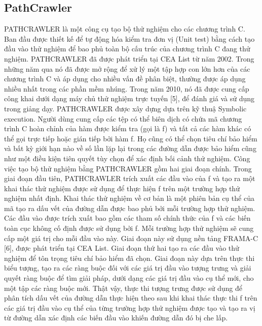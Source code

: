 \documentclass[12pt,a4paper]{article}
\begin{document}
\subsection{PathCrawler}
PATHCRAWLER là một công cụ tạo bộ thử nghiệm cho các chương trình C. Ban đầu được thiết kế để tự động hóa  kiểm tra đơn vị (Unit test) bằng cách tạo đầu vào thử nghiệm để bao phủ toàn bộ cấu trúc của chương trình C đang thử nghiệm.\newline
\indent PATHCRAWLER đã được phát triển tại CEA List từ năm 2002. Trong những năm qua nó đã được mở rộng để xử lý một tập hợp con lớn hơn của các chương trình C và áp dụng cho nhiều vấn đề phân biệt, thường được áp dụng nhiều nhất trong các phần mềm nhúng. Trong năm 2010, nó đã được cung cấp công khai dưới dạng máy chủ thử nghiệm trực tuyến [5], để đánh giá và sử dụng trong giảng dạy.\newline
\indent PATHCRAWLER được xây dựng dựa trên kỹ thuậ Symbolic execution. Người dùng cung cấp các tệp có thể biên dịch có chứa mã chương trình C hoàn chỉnh của hàm được kiểm tra (gọi là f) và tất cả các hàm khác có thể gọi trực tiếp hoặc gián tiếp bởi hàm f. Họ cũng có thể chọn tiêu chí bảo hiểm và bất kỳ giới hạn nào về số lần lặp lại trong các đường dẫn được bảo hiểm cũng như một điều kiện tiên quyết tùy chọn để xác định bối cảnh thử nghiệm. Công việc tạo bộ thử nghiệm bằng PATHCRAWLER gồm hai giai đoạn chính. Trong giai đoạn đầu tiên, PATHCRAWLER trích xuất các đầu vào của f và tạo ra một khai thác thử nghiệm được sử dụng để thực hiện f trên một trường hợp thử nghiệm nhất định. Khai thác thử nghiệm về cơ bản là một phiên bản cụ thể của mã tạo ra dấu vết của đường dẫn được bao phủ bởi mỗi trường hợp thử nghiệm. Các đầu vào được trích xuất bao gồm các tham số chính thức của f và các biến toàn cục không cố định được sử dụng bởi f. Mỗi trường hợp thử nghiệm sẽ cung cấp một giá trị cho mỗi đầu vào này. Giai đoạn này sử dụng nền tảng FRAMA-C [6], được phát triển tại CEA List. Giai đoạn thứ hai tạo ra các đầu vào thử nghiệm để tôn trọng tiêu chí bảo hiểm đã chọn.  Giai đoạn này dựa trên thực thi biểu tượng, tạo ra các ràng buộc đối với các giá trị đầu vào tượng trưng và giải quyết ràng buộc để tìm giải pháp, dưới dạng các giá trị đầu vào cụ thể mới, cho một tập các ràng buộc mới. Thật vậy, thực thi tượng trưng được sử dụng để phân tích dấu vết của đường dẫn thực hiện theo sau khi khai thác thực thi f trên các giá trị đầu vào cụ thể của từng trường hợp thử nghiệm được tạo và tạo ra vị từ đường dẫn xác định các biến đầu vào khiến đường dẫn đó bị che lấp.\newline
\end{document}
